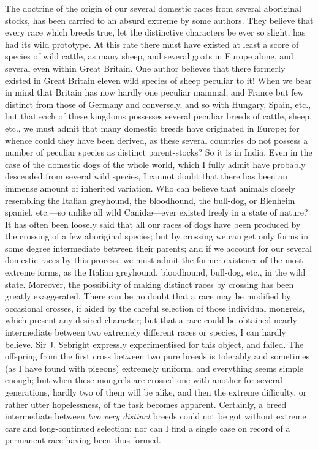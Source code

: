 \documentclass{book}
\begin{document}
The doctrine of the origin of our several domestic races from several
aboriginal stocks, has been carried to an absurd extreme by some authors. They
believe that every race which breeds true, let the distinctive characters be
ever so slight, has had its wild prototype. At this rate there must have
existed at least a score of species of wild cattle, as many sheep, and several
goats in Europe alone, and several even within Great Britain. One author
believes that there formerly existed in Great Britain eleven wild species of
sheep peculiar to it! When we bear in mind that Britain has now hardly one
peculiar mammal, and France but few distinct from those of Germany and
conversely, and so with Hungary, Spain, etc., but that each of these kingdoms
possesses several peculiar breeds of cattle, sheep, etc., we must admit that
many domestic breeds have originated in Europe; for whence could they have been
derived, as these several countries do not possess a number of peculiar species
as distinct parent-stocks? So it is in India. Even in the case of the domestic
dogs of the whole world, which I fully admit have probably descended from
several wild species, I cannot doubt that there has been an immense amount of
inherited variation. Who can believe that animals closely resembling the
Italian greyhound, the bloodhound, the bull-dog, or Blenheim spaniel,
etc.---so unlike all wild Canidæ---ever existed freely in a state of
nature? It has often been loosely said that all our races of dogs have been
produced by the crossing of a few aboriginal species; but by crossing we can
get only forms in some degree intermediate between their parents; and if we
account for our several domestic races by this process, we must admit the
former existence of the most extreme forms, as the Italian greyhound,
bloodhound, bull-dog, etc., in the wild state. Moreover, the possibility of
making distinct races by crossing has been greatly exaggerated. There can be no
doubt that a race may be modified by occasional crosses, if aided by the
careful selection of those individual mongrels, which present any desired
character; but that a race could be obtained nearly intermediate between two
extremely different races or species, I can hardly believe. Sir J. Sebright
expressly experimentised for this object, and failed. The offspring from the
first cross between two pure breeds is tolerably and sometimes (as I have found
with pigeons) extremely uniform, and everything seems simple enough; but when
these mongrels are crossed one with another for several generations, hardly two
of them will be alike, and then the extreme difficulty, or rather utter
hopelessness, of the task becomes apparent. Certainly, a breed intermediate
between \emph{two very distinct} breeds could not be got without extreme care
and long-continued selection; nor can I find a single case on record of a
permanent race having been thus formed.
\end{document}
